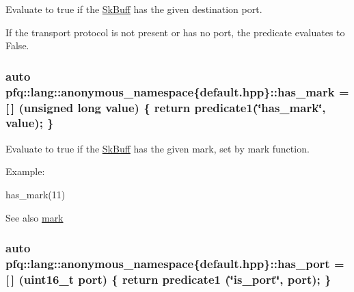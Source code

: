 Evaluate to {\ttfamily true} if the \hyperlink{structpfq_1_1lang_1_1SkBuff}{Sk\+Buff} has the given destination port. 

If the transport protocol is not present or has no port, the predicate evaluates to False. \hypertarget{namespacepfq_1_1lang_1_1anonymous__namespace_02default_8hpp_03_aa4ce1fdb0d99e1ca0afdf76619c58d12}{
\subsubsection[{has\+\_\+mark}]{\setlength{\rightskip}{0pt plus 5cm}auto pfq\+::lang\+::anonymous\+\_\+namespace\{default.\+hpp\}\+::has\+\_\+mark = \mbox{[}$\,$\mbox{]} (unsigned long value) \{ return {\bf predicate1}(\char`\"{}has\+\_\+mark\char`\"{}, value); \}}}\label{namespacepfq_1_1lang_1_1anonymous__namespace_02default_8hpp_03_aa4ce1fdb0d99e1ca0afdf76619c58d12}


Evaluate to {\ttfamily true} if the \hyperlink{structpfq_1_1lang_1_1SkBuff}{Sk\+Buff} has the given {\ttfamily mark}, set by mark function. 

Example\+:

has\+\_\+mark(11)

\begin{DoxySeeAlso}{See also}
\hyperlink{namespacepfq_1_1lang_1_1anonymous__namespace_02default_8hpp_03_a7b831baeabda070b89ca862a9445a4a8}{mark} 
\end{DoxySeeAlso}
\hypertarget{namespacepfq_1_1lang_1_1anonymous__namespace_02default_8hpp_03_a9f7161b8dfb842c5a845f413eb6bc82f}{
\subsubsection[{has\+\_\+port}]{\setlength{\rightskip}{0pt plus 5cm}auto pfq\+::lang\+::anonymous\+\_\+namespace\{default.\+hpp\}\+::has\+\_\+port = \mbox{[}$\,$\mbox{]} (uint16\+\_\+t {\bf port}) \{ return {\bf predicate1} (\char`\"{}is\+\_\+port\char`\"{}, port); \}}}\label{namespacepfq_1_1lang_1_1anonymous__namespace_02default_8hpp_03_a9f7161b8dfb842c5a845f413eb6bc82f}


